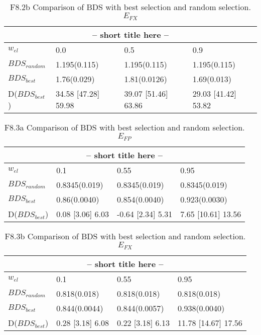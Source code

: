 \clearpage
\begin{landscape}
\begin{table}[h]
\label{at:xx}
\begin{center}
\begin{tabular}{llll}
\toprule
\multicolumn{4}{c}{-- short title here --}\\
\midrule
$w_{el}$ & 0.0 & 0.5 & 0.9\\
\midrule
$BDS_{random}$ & 1.195(0.115) & 1.195(0.115) & 1.195(0.115)\\
\midrule
$BDS_{best}$ & 1.76(0.029) & 1.81(0.0126) & 1.69(0.013)\\
D($BDS_{best}$) & 34.58 [47.28] 59.98 & 39.07 [51.46] 63.86 & 29.03 [41.42] 53.82\\
\bottomrule
\end{tabular}
\end{center}
\caption{F8.2b Comparison of BDS with best selection and random selection. $E_{FX}$}
\end{table}
\end{landscape}


\clearpage
\begin{landscape}
\begin{table}[h]
\label{at:xx}
\begin{center}
\begin{tabular}{llll}
\toprule
\multicolumn{4}{c}{-- short title here --}\\
\midrule
$w_{el}$ & 0.1 & 0.55 & 0.95\\
\midrule
$BDS_{random}$ & 0.8345(0.019) & 0.8345(0.019) & 0.8345(0.019)\\
\midrule
$BDS_{best}$ & 0.86(0.0040) & 0.854(0.0040) & 0.923(0.0030)\\
D($BDS_{best}$) & 0.08 [3.06] 6.03 & -0.64 [2.34] 5.31 & 7.65 [10.61] 13.56\\
\bottomrule
\end{tabular}
\end{center}
\caption{F8.3a Comparison of BDS with best selection and random selection. $E_{FP}$}
\end{table}
\end{landscape}


\clearpage
\begin{landscape}
\begin{table}[h]
\label{at:xx}
\begin{center}
\begin{tabular}{llll}
\toprule
\multicolumn{4}{c}{-- short title here --}\\
\midrule
$w_{el}$ & 0.1 & 0.55 & 0.95\\
\midrule
$BDS_{random}$ & 0.818(0.018) & 0.818(0.018) & 0.818(0.018)\\
\midrule
$BDS_{best}$ & 0.844(0.0044) & 0.844(0.0057) & 0.938(0.0040)\\
D($BDS_{best}$) & 0.28 [3.18] 6.08 & 0.22 [3.18] 6.13 & 11.78 [14.67] 17.56\\
\bottomrule
\end{tabular}
\end{center}
\caption{F8.3b Comparison of BDS with best selection and random selection. $E_{FX}$}
\end{table}
\end{landscape}


